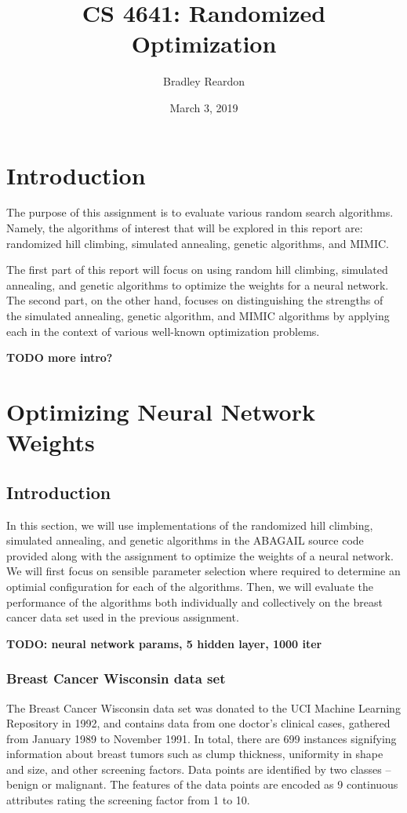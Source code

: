 \documentclass{article}
\title{\textbf{CS 4641:} Randomized Optimization}
\author{Bradley Reardon}
\date{March 3, 2019}
\begin{document}
  \maketitle

  \section{Introduction}
    The purpose of this assignment is to evaluate various random search algorithms. Namely, the algorithms of interest that will be explored in this report are: randomized hill climbing, simulated annealing, genetic algorithms, and MIMIC.

    The first part of this report will focus on using random hill climbing, simulated annealing, and genetic algorithms to optimize the weights for a neural network. The second part, on the other hand, focuses on distinguishing the strengths of the simulated annealing, genetic algorithm, and MIMIC algorithms by applying each in the context of various well-known optimization problems.

    \textbf{TODO more intro?}

  \section{Optimizing Neural Network Weights}

    \subsection{Introduction}
      In this section, we will use implementations of the randomized hill climbing, simulated annealing, and genetic algorithms in the ABAGAIL source code provided along with the assignment to optimize the weights of a neural network. We will first focus on sensible parameter selection where required to determine an optimial configuration for each of the algorithms. Then, we will evaluate the performance of the algorithms both individually and collectively on the breast cancer data set used in the previous assignment.

      \textbf{TODO: neural network params, 5 hidden layer, 1000 iter}

      \subsubsection{Breast Cancer Wisconsin data set}
        The Breast Cancer Wisconsin data set was donated to the UCI Machine Learning Repository in 1992, and contains data from one doctor's clinical cases, gathered from January 1989 to November 1991. In total, there are 699 instances signifying information about breast tumors such as clump thickness, uniformity in shape and size, and other screening factors. Data points are identified by two classes -- benign or malignant. The features of the data points are encoded as 9 continuous attributes rating the screening factor from 1 to 10.
\end{document}
